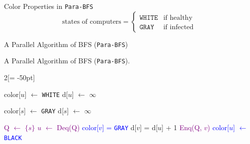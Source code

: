 \documentclass{beamer}
\begin{document}
\begin{frame}{Color Properties in \texttt{Para-BFS}}
  \begin{displaymath}
	\textrm{states of computers} = \left\{ \begin{array}{ll}
	\texttt{WHITE} & \textrm{if healthy}\\
	\texttt{GRAY} & \textrm{if infected}
	\end{array} \right.
  \end{displaymath}
\end{frame}
\begin{frame}{A Parallel Algorithm of BFS (\texttt{Para-BFS})}
  \begin{algorithm}[H]
    \caption{A Parallel Algorithm of BFS (\texttt{Para-BFS}).}
    \begin{multicols}{2}[\columnsep = -50pt]
    \begin{algorithmic}[]
    {\footnotesize
		  \State color[$u$] $\gets$ \texttt{WHITE}
		  \State d[$u$] $\gets$ $\infty$
		\EndFor

		\Statex
		\State color[$s$] $\gets$ \texttt{GRAY}
		\State d[$s$] $\gets$ $\infty$

		\Statex
		\State \textcolor{purple}{\textrm{Q} $\gets$ $\{ s \}$}
		    \State \textcolor{purple}{$u$ $\gets$ Deq(\textrm{Q})}
			    \State \textcolor{blue}{color[$v$] = \texttt{GRAY}}
			    \State d[$v$] = d[$u$] + 1
			    \State \textcolor{purple}{Enq(\textrm{Q}, $v$)}
			  \EndIf
			\EndFor
			\State \textcolor{blue}{color[$u$] $\gets$ \texttt{BLACK}}
		  \EndFor
		\EndWhile
      \EndProcedure
    }
    \end{algorithmic}
    \end{multicols}
  \end{algorithm}
\end{frame}
\end{document}
